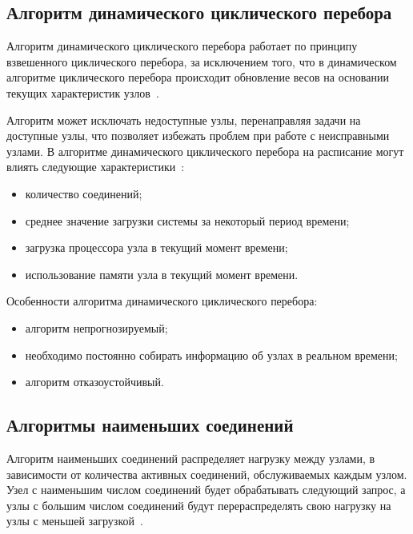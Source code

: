 \subsection{Алгоритм динамического циклического перебора}

Алгоритм динамического циклического перебора работает по принципу взвешенного циклического перебора, за исключением того, что 
в динамическом алгоритме циклического перебора происходит обновление весов на основании текущих характеристик узлов~\cite{drr, nginx}.

Алгоритм может исключать недоступные узлы, перенаправляя задачи на доступные узлы, что позволяет избежать проблем при работе с неисправными узлами. 
В алгоритме динамического циклического перебора на расписание могут влиять следующие характеристики~\cite{dll_warsh, com_analysis, part_algos}: 
\begin{itemize}
	\item количество соединений;
	\item среднее значение загрузки системы за некоторый период времени;
	\item загрузка процессора узла в текущий момент времени;
	\item использование памяти узла в текущий момент времени.
\end{itemize}

Особенности алгоритма динамического циклического перебора:
\begin{itemize}
	\item алгоритм непрогнозируемый;
	\item необходимо постоянно собирать информацию об узлах в реальном времени;
	\item алгоритм отказоустойчивый.
\end{itemize}


\subsection{Алгоритмы наименьших соединений}

Алгоритм наименьших соединений распределяет нагрузку между узлами, в зависимости от количества активных соединений, обслуживаемых каждым узлом.
Узел с наименьшим числом соединений будет обрабатывать следующий запрос, а узлы с большим числом соединений будут перераспределять свою нагрузку на узлы с меньшей загрузкой~\cite{leastconnection}.

